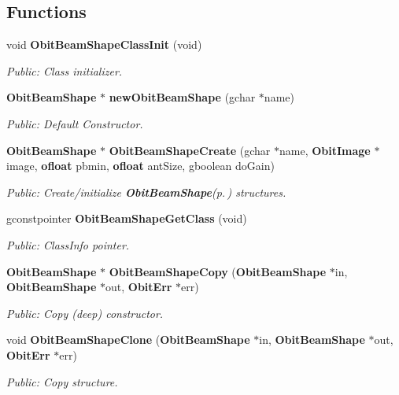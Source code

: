 \subsection*{Functions}
\begin{CompactItemize}
\item 
void {\bf Obit\-Beam\-Shape\-Class\-Init} (void)
\begin{CompactList}\small\item\em Public: Class initializer. \item\end{CompactList}\item 
{\bf Obit\-Beam\-Shape} $\ast$ {\bf new\-Obit\-Beam\-Shape} (gchar $\ast$name)
\begin{CompactList}\small\item\em Public: Default Constructor. \item\end{CompactList}\item 
{\bf Obit\-Beam\-Shape} $\ast$ {\bf Obit\-Beam\-Shape\-Create} (gchar $\ast$name, {\bf Obit\-Image} $\ast$image, {\bf ofloat} pbmin, {\bf ofloat} ant\-Size, gboolean do\-Gain)
\begin{CompactList}\small\item\em Public: Create/initialize {\bf Obit\-Beam\-Shape}{\rm (p.\,\pageref{structObitBeamShape})} structures. \item\end{CompactList}\item 
gconstpointer {\bf Obit\-Beam\-Shape\-Get\-Class} (void)
\begin{CompactList}\small\item\em Public: Class\-Info pointer. \item\end{CompactList}\item 
{\bf Obit\-Beam\-Shape} $\ast$ {\bf Obit\-Beam\-Shape\-Copy} ({\bf Obit\-Beam\-Shape} $\ast$in, {\bf Obit\-Beam\-Shape} $\ast$out, {\bf Obit\-Err} $\ast$err)
\begin{CompactList}\small\item\em Public: Copy (deep) constructor. \item\end{CompactList}\item 
void {\bf Obit\-Beam\-Shape\-Clone} ({\bf Obit\-Beam\-Shape} $\ast$in, {\bf Obit\-Beam\-Shape} $\ast$out, {\bf Obit\-Err} $\ast$err)
\begin{CompactList}\small\item\em Public: Copy structure. \item\end{CompactList}\item 

\end{CompactItemize}
